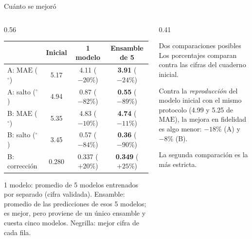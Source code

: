 \documentclass[aspectratio=169,10pt,t]{beamer}
\newcommand{\gr}{$^\circ$}
\newcommand{\mae}{\ensuremath{\mathrm{MAE}}}
\begin{document}
\begin{frame}{Cuánto se mejoró}
\begin{columns}[T]
\begin{column}{0.56\textwidth}
\footnotesize\setlength{\tabcolsep}{3.5pt}
\begin{tabular}{@{}lccc@{}}
\toprule
 & \textbf{Inicial} & \textbf{1 modelo} & \textbf{Ensamble de 5}\\
\midrule
A: \mae{} (\gr) & 5.17 & 4.11 ($-20\%$) & \textbf{3.91} ($-24\%$)\\
A: salto (\gr) & 4.94 & 0.87 ($-82\%$) & \textbf{0.55} ($-89\%$)\\
B: \mae{} (\gr) & 5.35 & 4.83 ($-10\%$) & \textbf{4.74} ($-11\%$)\\
B: salto (\gr) & 3.45 & 0.57 ($-84\%$) & \textbf{0.36} ($-90\%$)\\
B: corrección & 0.280 & 0.337 ($+20\%$) & \textbf{0.349} ($+25\%$)\\
\bottomrule
\end{tabular}

\vspace{4pt}
{\scriptsize 1 modelo: promedio de 5 modelos entrenados por separado (cifra validada). Ensamble: promedio de las predicciones de esos 5 modelos; es mejor, pero proviene de un único ensamble y cuesta cinco modelos. Negrilla: mejor cifra de cada fila.}
\end{column}
\begin{column}{0.41\textwidth}
\begin{alertblock}{Dos comparaciones posibles}\small
Los porcentajes comparan contra las cifras del cuaderno inicial.

Contra la \emph{reproducción} del modelo inicial con el mismo protocolo (4.99 y 5.25 de \mae{}), la mejora en fidelidad es algo menor: $-18\%$ (A) y $-8\%$ (B).

La segunda comparación es la más estricta.
\end{alertblock}
\end{column}
\end{columns}
\end{frame}
\end{document}

